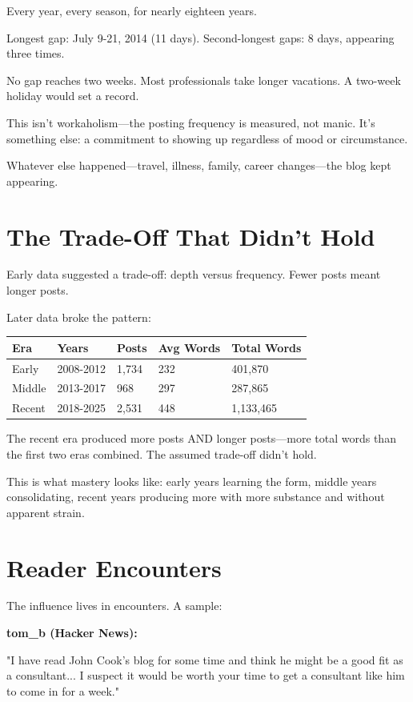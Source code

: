 Every year, every season, for nearly eighteen years.

Longest gap: July 9-21, 2014 (11 days).
Second-longest gaps: 8 days, appearing three times.

No gap reaches two weeks. Most professionals take longer vacations. A two-week holiday would set a record.

This isn't workaholism---the posting frequency is measured, not manic. It's something else: a commitment to showing up regardless of mood or circumstance.

Whatever else happened---travel, illness, family, career changes---the blog kept appearing.

\bigskip

\section*{The Trade-Off That Didn't Hold}

Early data suggested a trade-off: depth versus frequency. Fewer posts meant longer posts.

Later data broke the pattern:

\begin{longtable}{p{1.80cm}p{1.80cm}p{1.80cm}p{1.80cm}p{1.80cm}}
\toprule
\textbf{Era} & \textbf{Years} & \textbf{Posts} & \textbf{Avg Words} & \textbf{Total Words} \tabularnewline
\midrule
Early & 2008-2012 & 1,734 & 232 & 401,870 \tabularnewline
Middle & 2013-2017 & 968 & 297 & 287,865 \tabularnewline
Recent & 2018-2025 & 2,531 & 448 & 1,133,465 \tabularnewline
\bottomrule
\end{longtable}

The recent era produced more posts AND longer posts---more total words than the first two eras combined. The assumed trade-off didn't hold.

This is what mastery looks like: early years learning the form, middle years consolidating, recent years producing more with more substance and without apparent strain.

\bigskip

\section*{Reader Encounters}

The influence lives in encounters. A sample:

\textbf{tom\_b (Hacker News):}
\begin{blogquote}
"I have read John Cook's blog for some time and think he might be a good fit as a consultant... I suspect it would be worth your time to get a consultant like him to come in for a week."
\end{blogquote}

